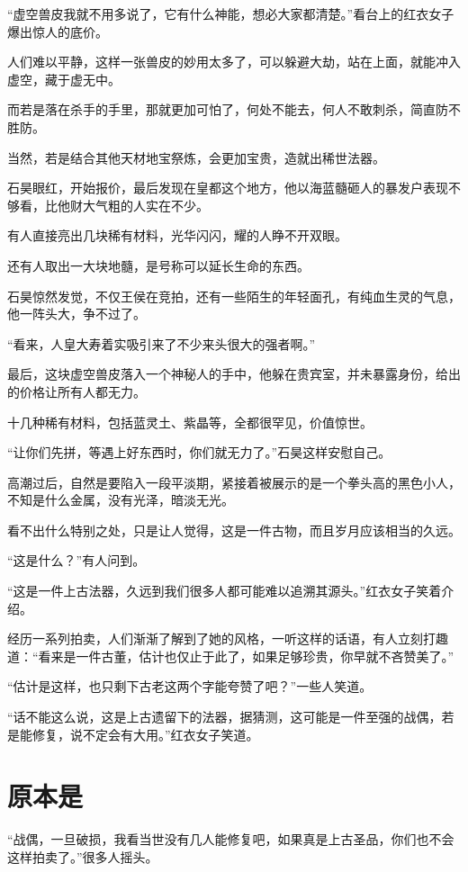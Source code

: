 “虚空兽皮我就不用多说了，它有什么神能，想必大家都清楚。”看台上的红衣女子爆出惊人的底价。

人们难以平静，这样一张兽皮的妙用太多了，可以躲避大劫，站在上面，就能冲入虚空，藏于虚无中。

而若是落在杀手的手里，那就更加可怕了，何处不能去，何人不敢刺杀，简直防不胜防。

当然，若是结合其他天材地宝祭炼，会更加宝贵，造就出稀世法器。

石昊眼红，开始报价，最后发现在皇都这个地方，他以海蓝髓砸人的暴发户表现不够看，比他财大气粗的人实在不少。

有人直接亮出几块稀有材料，光华闪闪，耀的人睁不开双眼。

还有人取出一大块地髓，是号称可以延长生命的东西。

石昊惊然发觉，不仅王侯在竞拍，还有一些陌生的年轻面孔，有纯血生灵的气息，他一阵头大，争不过了。

“看来，人皇大寿着实吸引来了不少来头很大的强者啊。”

最后，这块虚空兽皮落入一个神秘人的手中，他躲在贵宾室，并未暴露身份，给出的价格让所有人都无力。

十几种稀有材料，包括蓝灵土、紫晶等，全都很罕见，价值惊世。

“让你们先拼，等遇上好东西时，你们就无力了。”石昊这样安慰自己。

高潮过后，自然是要陷入一段平淡期，紧接着被展示的是一个拳头高的黑色小人，不知是什么金属，没有光泽，暗淡无光。

看不出什么特别之处，只是让人觉得，这是一件古物，而且岁月应该相当的久远。

“这是什么？”有人问到。

“这是一件上古法器，久远到我们很多人都可能难以追溯其源头。”红衣女子笑着介绍。

经历一系列拍卖，人们渐渐了解到了她的风格，一听这样的话语，有人立刻打趣道：“看来是一件古董，估计也仅止于此了，如果足够珍贵，你早就不吝赞美了。”

“估计是这样，也只剩下古老这两个字能夸赞了吧？”一些人笑道。

“话不能这么说，这是上古遗留下的法器，据猜测，这可能是一件至强的战偶，若是能修复，说不定会有大用。”红衣女子笑道。

\section{原本是}

“战偶，一旦破损，我看当世没有几人能修复吧，如果真是上古圣品，你们也不会这样拍卖了。”很多人摇头。


